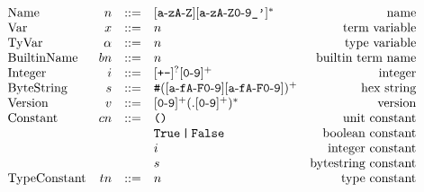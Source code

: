 \documentclass[../plutus-core-specification.tex]{subfiles}
\begin{document}
\begin{minipage}{\linewidth}
    \centering
    \[\begin{array}{lrclr}

        \textrm{Name}        & n      & ::= & [\texttt{a}\!\hyphen{}\!\texttt{z}\texttt{A}\!\hyphen{}\!\texttt{Z}][\texttt{a}\!\hyphen{}\!\texttt{zA}\!\hyphen{}\!\texttt{Z0}\!\hyphen{}\!\texttt{9\_'}]^*   & \textrm{name}\\

        \textrm{Var}           & x      & ::= & n & \textrm{term variable}\\
        \textrm{TyVar}         & \alpha & ::= & n & \textrm{type variable}\\
        \textrm{BuiltinName}   & bn     & ::= & n & \textrm{builtin term name}\\
        \textrm{Integer} & i  & ::= & [\texttt{+-}]^?[\texttt{0}\!\hyphen{}\!\texttt{9}]^+ & \textrm{integer}\\

        \textrm{ByteString}   & s  & ::= & \texttt{\#}([\texttt{a}\!\hyphen{}\!\texttt{fA}\!\hyphen{}\!\texttt{F0}\!\hyphen{}\!\texttt{9}][\texttt{a}\!\hyphen{}\!\texttt{fA}\!\hyphen{}\!\texttt{F0}\!\hyphen{}\!\texttt{9}])^+ & \textrm{hex string}\\

        \textrm{Version} & v & ::= & [\texttt{0}\!\hyphen{}\!\texttt{9}]^+(.[\texttt{0}\!\hyphen{}\!\texttt{9}]^+)^* & \textrm{version}\\

        \textrm{Constant} & cn & ::= & \texttt{()} & \textrm{unit constant}\\
                          &    &     & \true \texttt{\,|\,} \false & \textrm{boolean constant}\\
                          &    &     & i & \textrm{integer constant}\\
                          &    &     & s & \textrm{bytestring constant}\\

        \textrm{TypeConstant} & tn    & ::= & n & \textrm{type constant}\\


    \end{array}\]
    \label{fig:lexical-grammar}
\end{minipage}
\end{document}
